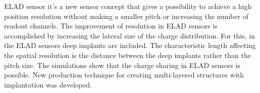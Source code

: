 ELAD sensor it's a new sensor concept that gives a possibility to achieve a high position resolution without making a smaller pitch or increasing the number of readout channels. The improvement of resolution in ELAD sensors is accomplished by increasing the lateral size of the charge distribution. For this, in the ELAD sensors deep implants are included. The characteristic length affecting the spatial resolution is the distance between the deep implants rather than the pitch size. The simulations show that the charge sharing in ELAD sensors is possible. New production technique for creating multi-layered structures with implantation was developed. 